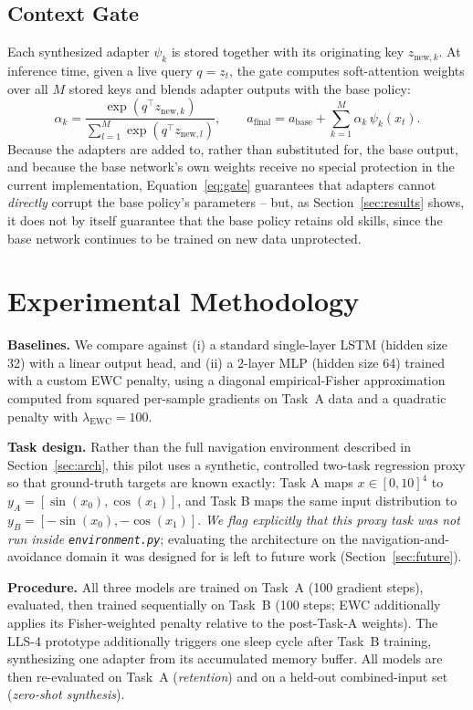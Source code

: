 \documentclass[11pt]{article}
\begin{document}
\subsection{Context Gate}
Each synthesized adapter $\psi_k$ is stored together with its originating key $z_{\text{new},k}$. At inference time, given a live query $q = z_t$, the gate computes soft-attention weights over all $M$ stored keys and blends adapter outputs with the base policy:
\begin{equation}
\alpha_k = \frac{\exp(q^\top z_{\text{new},k})}{\sum_{l=1}^{M}\exp(q^\top z_{\text{new},l})}, \qquad
a_{\text{final}} = a_{\text{base}} + \sum_{k=1}^{M} \alpha_k\, \psi_k(x_t).
\label{eq:gate}
\end{equation}
Because the adapters are added to, rather than substituted for, the base output, and because the base network's own weights receive no special protection in the current implementation, Equation~\ref{eq:gate} guarantees that adapters cannot \emph{directly} corrupt the base policy's parameters -- but, as Section~\ref{sec:results} shows, it does not by itself guarantee that the base policy retains old skills, since the base network continues to be trained on new data unprotected.

\section{Experimental Methodology}
\label{sec:method}

\textbf{Baselines.} We compare against (i) a standard single-layer LSTM (hidden size 32) with a linear output head, and (ii) a 2-layer MLP (hidden size 64) trained with a custom EWC penalty, using a diagonal empirical-Fisher approximation computed from squared per-sample gradients on Task~A data and a quadratic penalty with $\lambda_{\text{EWC}}=100$.

\textbf{Task design.} Rather than the full navigation environment described in Section~\ref{sec:arch}, this pilot uses a synthetic, controlled two-task regression proxy so that ground-truth targets are known exactly: Task A maps $x \in [0,10]^4$ to $y_A = [\sin(x_0), \cos(x_1)]$, and Task B maps the same input distribution to $y_B = [-\sin(x_0), -\cos(x_1)]$. \emph{We flag explicitly that this proxy task was not run inside \texttt{environment.py}}; evaluating the architecture on the navigation-and-avoidance domain it was designed for is left to future work (Section~\ref{sec:future}).

\textbf{Procedure.} All three models are trained on Task~A (100 gradient steps), evaluated, then trained sequentially on Task~B (100 steps; EWC additionally applies its Fisher-weighted penalty relative to the post-Task-A weights). The LLS-4 prototype additionally triggers one sleep cycle after Task~B training, synthesizing one adapter from its accumulated memory buffer. All models are then re-evaluated on Task~A (\emph{retention}) and on a held-out combined-input set (\emph{zero-shot synthesis}).
\end{document}
